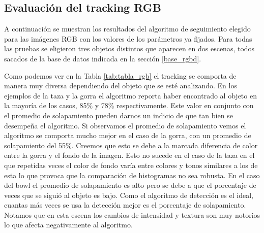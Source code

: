 \subsection{Evaluación del tracking RGB}\label{eval_rgb}
A continuación se muestran los resultados del algoritmo de seguimiento elegido para las imágenes RGB con los valores de los parámetros ya fijados. Para todas las pruebas se eligieron tres objetos distintos que aparecen en dos escenas, todos sacados de la base de datos indicada en la sección \ref{base_rgbd}.

Como podemos ver en la Tabla \ref{tab:tabla_rgb} el tracking se comporta de manera muy diversa dependiendo del objeto que se esté analizando. En los ejemplos de la taza y la gorra el algoritmo reporta haber encontrado al objeto en la mayoría de los casos, 85\% y 78\% respectivamente. Este valor en conjunto con el promedio de solapamiento pueden darnos un indicio de que tan bien se desempeña el algoritmo. Si observamos el promedio de solapamiento vemos el algoritmo se comporta mucho mejor en el caso de la gorra, con un promedio de solapamiento del 55\%. Creemos que esto se debe a la marcada diferencia de color entre la gorra y el fondo de la imagen. Esto no sucede en el caso de la taza en el que repetidas veces el color de fondo varía entre colores y tonos similares a los de esta lo que provoca que la comparación de histogramas no sea robusta. En el caso del bowl el promedio de solapamiento es alto pero se debe a que el porcentaje de veces que se siguió al objeto es bajo. Como el algoritmo de detección es el ideal, cuantas más veces se usa la detección mejor es el porcentaje de solapamiento. Notamos que en esta escena los cambios de intensidad y textura son muy notorios lo que afecta negativamente al algoritmo.


